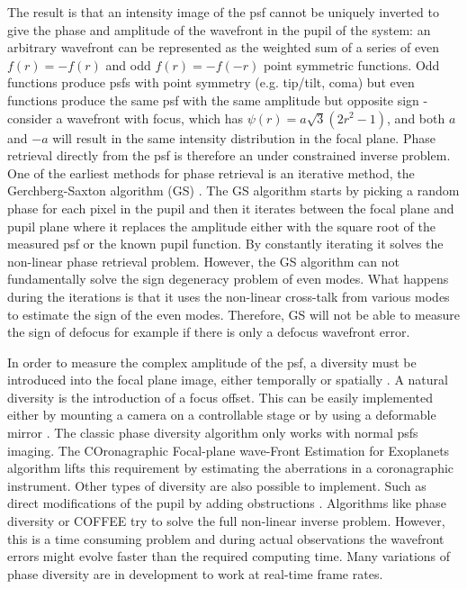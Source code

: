 \documentclass[letterpaper]{ar-1col}
\begin{document}
The result is that an intensity image of the \ac{psf} cannot be uniquely inverted to give the phase and amplitude of the wavefront in the pupil of the system: an arbitrary wavefront can be represented as the weighted sum of a series of even $f(r)=-f(r)$ and odd $f(r)=-f(-r)$ point symmetric functions.
%
Odd functions produce \acp{psf} with point symmetry (e.g. tip/tilt, coma) but even functions produce the same \ac{psf} with the same amplitude but opposite sign - consider a wavefront with focus, which has $\psi(r) = a\sqrt{3}(2r^2-1)$, and both $a$ and $-a$ will result in the same intensity distribution in the focal plane.
%
Phase retrieval directly from the \ac{psf} is therefore an under constrained inverse problem. One of the earliest methods for phase retrieval is an iterative method, the Gerchberg-Saxton algorithm (GS) \citep{Gerchberg72}. The GS algorithm starts by picking a random phase for each pixel in the pupil and then it iterates between the focal plane and pupil plane where it replaces the amplitude either with the square root of the measured \ac{psf} or the known  pupil function. By constantly iterating it solves the non-linear phase retrieval problem. However, the GS algorithm can not fundamentally solve the sign degeneracy problem of even modes. What happens during the iterations is that it uses the non-linear cross-talk from various modes to estimate the sign of the even modes. Therefore, GS will not be able to measure the sign of defocus for example if there is only a defocus wavefront error.

In order to measure the complex amplitude of the \ac{psf}, a diversity must be introduced into the focal plane image, either temporally or spatially \citep[see ][ for a review of these]{Fienup13,Gonsalves14}. A natural diversity is the introduction of a focus offset. This can be easily implemented either by mounting a camera on a controllable stage or by using a deformable mirror \citep{VanGorkom21DMs}. The classic phase diversity algorithm only works with normal \acp{psf} imaging. The COronagraphic Focal-plane wave-Front Estimation for Exoplanets \citep[COFFEE ;][]{Sauvage12,Paul13} algorithm lifts this requirement by estimating the aberrations in a coronagraphic instrument. Other types of diversity are also possible to implement. Such as direct modifications of the pupil by adding obstructions \citep{martinache2013asymmetric, brooks2016polarization, bos2019focal}. %
%
Algorithms like phase diversity or COFFEE try to solve the full non-linear inverse problem. However, this is a time consuming problem and during actual observations the wavefront errors might evolve faster than the required computing time. Many variations of phase diversity are in development to work at real-time frame rates. 
\end{document}
